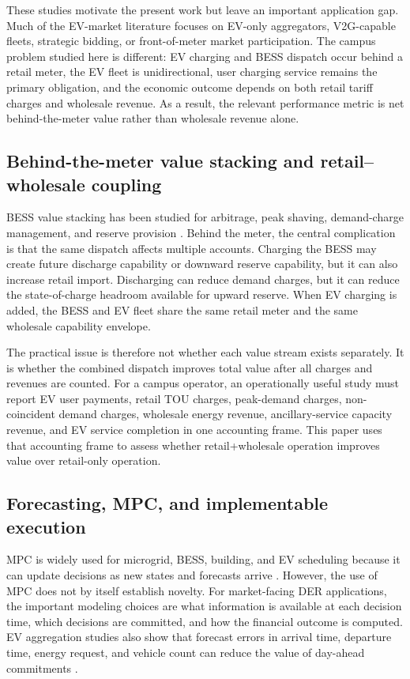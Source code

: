 \documentclass[final,5p,times]{elsarticle}
\begin{document}
These studies motivate the present work but leave an important application gap. Much of the EV-market literature focuses on EV-only aggregators, V2G-capable fleets, strategic bidding, or front-of-meter market participation. The campus problem studied here is different: EV charging and BESS dispatch occur behind a retail meter, the EV fleet is unidirectional, user charging service remains the primary obligation, and the economic outcome depends on both retail tariff charges and wholesale revenue. As a result, the relevant performance metric is net behind-the-meter value rather than wholesale revenue alone.

\subsection{Behind-the-meter value stacking and retail--wholesale coupling}
BESS value stacking has been studied for arbitrage, peak shaving, demand-charge management, and reserve provision \cite{parisio2014model,wang2018predictive,ghosh2022battery,liu2022battery}. Behind the meter, the central complication is that the same dispatch affects multiple accounts. Charging the BESS may create future discharge capability or downward reserve capability, but it can also increase retail import. Discharging can reduce demand charges, but it can reduce the state-of-charge headroom available for upward reserve. When EV charging is added, the BESS and EV fleet share the same retail meter and the same wholesale capability envelope.

The practical issue is therefore not whether each value stream exists separately. It is whether the combined dispatch improves total value after all charges and revenues are counted. For a campus operator, an operationally useful study must report EV user payments, retail TOU charges, peak-demand charges, non-coincident demand charges, wholesale energy revenue, ancillary-service capacity revenue, and EV service completion in one accounting frame. This paper uses that accounting frame to assess whether retail+wholesale operation improves value over retail-only operation.

\subsection{Forecasting, MPC, and implementable execution}
MPC is widely used for microgrid, BESS, building, and EV scheduling because it can update decisions as new states and forecasts arrive \cite{parisio2014model,wang2018predictive,li2021learning}. However, the use of MPC does not by itself establish novelty. For market-facing DER applications, the important modeling choices are what information is available at each decision time, which decisions are committed, and how the financial outcome is computed. EV aggregation studies also show that forecast errors in arrival time, departure time, energy request, and vehicle count can reduce the value of day-ahead commitments \cite{chen2024costoptimal,chen2026realtime}.
\end{document}
